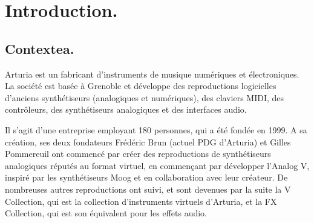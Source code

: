 \documentclass[francais]{rapportPFE}  %
\begin{document}
\begin{ResumeMotsCles}
\end{ResumeMotsCles}








\setcounter{tocdepth}{3}
\tableofcontents
\cleardoublepage




     
     
     
\section{Introduction.}
\subsection{Contextea.}

Arturia est un fabricant d'instruments de musique numériques et électroniques. La société est basée à Grenoble et développe des reproductions logicielles d'anciens synthétiseurs (analogiques et numériques), des claviers MIDI, des contrôleurs, des synthétiseurs analogiques et des interfaces audio. 

Il s'agit d'une entreprise employant 180 personnes, qui a été fondée en 1999. A sa création, ses deux fondateurs Frédéric Brun (actuel PDG d'Arturia) et Gilles Pommereuil ont commencé par créer des reproductions de synthétiseurs analogiques réputés au format virtuel, en commençant par développer l'Analog V, inspiré par les synthétiseurs Moog et en collaboration avec leur créateur. De nombreuses autres reproductions ont suivi, et sont devenues par la suite la V Collection, qui est la collection d'instruments virtuels d'Arturia, et la FX Collection, qui est son équivalent pour les effets audio.
\end{document}
